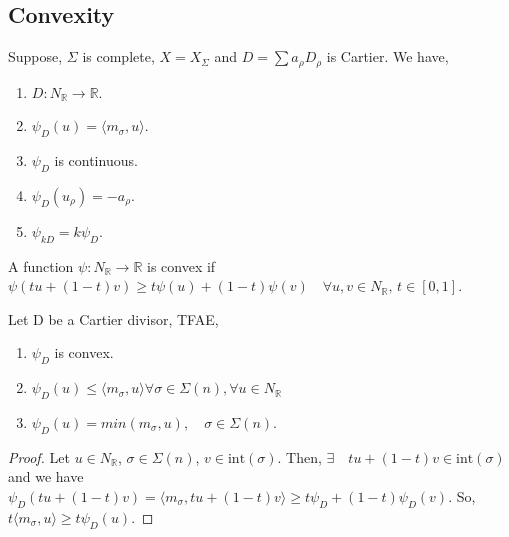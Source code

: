 \documentclass[a4paper,12pt]{amsart}
\begin{document}
\subsection{Convexity}
Suppose, $\Sigma$ is complete, $X = X_\Sigma$ and $D = \sum a_\rho D_\rho$ is Cartier. We have,
\begin{enumerate}
	 \item $D : N_\mathbb{R} \rightarrow \mathbb{R}$.
	 \item $\psi_D(u) = \langle m_\sigma,u\rangle $.
	 \item $\psi_D$ is continuous.
	 \item $\psi_D(u_\rho)=-a_\rho$.
	 \item $\psi_{kD} = k\psi_D$.
\end{enumerate}
\begin{definition}
	A function $\psi:N_\mathbb{R} \rightarrow \mathbb{R}$ is convex if $\psi(tu + (1-t)v) \geq t\psi(u) + (1-t)\psi(v)\quad \forall u,v \in N_\mathbb{R},\, t\in[0,1]$.
\end{definition}
\begin{Lemma}
	Let D be a Cartier divisor, TFAE,
	\begin{enumerate}
		\item $\psi_D$ is convex.
		\item $\psi_D(u) \leq \langle m_\sigma,u\rangle  \forall \sigma \in \Sigma(n), \forall u\in N_\mathbb{R}$
		\item $\psi_D(u) = min(m_\sigma,u), \quad \sigma \in \Sigma(n)$.
	\end{enumerate}
\end{Lemma}
\begin{proof}
	Let $u \in N_\mathbb{R}$, $\sigma \in \Sigma(n)$, $v\in \text{int}(\sigma)$. Then, $\exists \quad tu + (1-t)v \in \text{int}(\sigma)$ and we have $\psi_D(tu + (1-t)v) = \langle m_\sigma,tu+(1-t)v\rangle  \geq t\psi_D + (1-t)\psi_D(v)$. So, $t \langle m_\sigma,u\rangle  \geq t \psi_D(u)$.
\end{proof}
\end{document}
